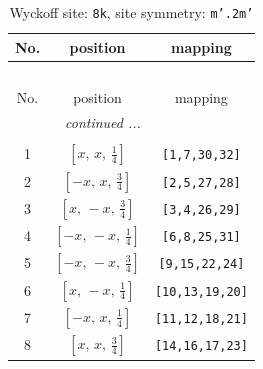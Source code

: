 \documentclass[fleqn,8pt]{jsarticle}
\begin{document}
\begin{longtable}{ccc}
\caption{Wyckoff site: {\tt 8k}, site symmetry: {\tt m'.2m'}}
 \\
 \hline \hline
No. & position & mapping \\ \hline \endfirsthead

\multicolumn{2}{l}{\tablename\ \thetable{}} \\
 \hline \hline
No. & position & mapping \\ \hline \endhead

 \hline \hline
\multicolumn{2}{r}{\footnotesize\it continued ...} \\ \endfoot

 \hline \hline
\multicolumn{2}{r}{} \\ \endlastfoot

1 & $\left[ x,\, x,\, \frac{1}{4} \right]$ & {\tt [1,7,30,32]} \\ \hline
2 & $\left[ - x,\, x,\, \frac{3}{4} \right]$ & {\tt [2,5,27,28]} \\ \hline
3 & $\left[ x,\, - x,\, \frac{3}{4} \right]$ & {\tt [3,4,26,29]} \\ \hline
4 & $\left[ - x,\, - x,\, \frac{1}{4} \right]$ & {\tt [6,8,25,31]} \\ \hline
5 & $\left[ - x,\, - x,\, \frac{3}{4} \right]$ & {\tt [9,15,22,24]} \\ \hline
6 & $\left[ x,\, - x,\, \frac{1}{4} \right]$ & {\tt [10,13,19,20]} \\ \hline
7 & $\left[ - x,\, x,\, \frac{1}{4} \right]$ & {\tt [11,12,18,21]} \\ \hline
8 & $\left[ x,\, x,\, \frac{3}{4} \right]$ & {\tt [14,16,17,23]} \\
\end{longtable}
\renewcommand{\arraystretch}{1.2}
\end{document}
